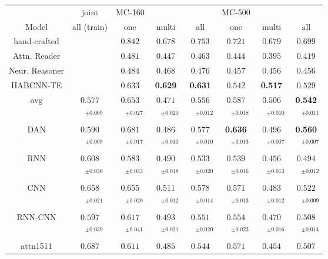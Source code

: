 \documentclass[11pt]{article}
\begin{document}
\begin{figure*}[t]
\centering
\setlength{\tabcolsep}{3pt}
\begin{tabular}{|c|c|ccc|ccc|}
\hline
& joint & MC-160     &             &            & MC-500     &      & \\
Model       & all (train)        & one & multi & all & one & multi & all \\
\hline
\hline
hand-crafted &  & $0.842$ & $0.678$ & $0.753$ & $0.721$ & $0.679$ & $0.699$\\
\hline
\hline
Attn. Reader & & $0.481$ & $0.447$ & $0.463$ & $0.444$ & $0.395$ & $0.419$ \\
Neur. Reasoner & & $0.484$ & $0.468$ & $0.476$ & $0.457$ & $0.456$ & $0.456$ \\
HABCNN-TE & & $0.633$ & \textbf{0.629} & \textbf{0.631} & $0.542$ & \textbf{0.517} & $0.529$ \\
\hline
avg & $0.577$ & $0.653$ & $0.471$ & $0.556$ & $0.587$ & $0.506$ & \textbf{0.542}\\
 & $\quad^{\pm0.009}$ & $\quad^{\pm0.027}$ & $\quad^{\pm0.020}$ & $\quad^{\pm0.012}$ & $\quad^{\pm0.018}$ & $\quad^{\pm0.010}$ & $\quad^{\pm0.011}$\\
DAN & $0.590$ & $0.681$ & $0.486$ & $0.577$ & \textbf{0.636} & $0.496$ & \textbf{0.560}\\
 & $\quad^{\pm0.009}$ & $\quad^{\pm0.017}$ & $\quad^{\pm0.010}$ & $\quad^{\pm0.010}$ & $\quad^{\pm0.013}$ & $\quad^{\pm0.007}$ & $\quad^{\pm0.007}$\\
\hline
RNN & $0.608$ & $0.583$ & $0.490$ & $0.533$ & $0.539$ & $0.456$ & $0.494$\\
 & $\quad^{\pm0.030}$ & $\quad^{\pm0.033}$ & $\quad^{\pm0.018}$ & $\quad^{\pm0.020}$ & $\quad^{\pm0.016}$ & $\quad^{\pm0.013}$ & $\quad^{\pm0.012}$\\
CNN & $0.658$ & $0.655$ & $0.511$ & $0.578$ & $0.571$ & $0.483$ & $0.522$\\
 & $\quad^{\pm0.021}$ & $\quad^{\pm0.020}$ & $\quad^{\pm0.012}$ & $\quad^{\pm0.014}$ & $\quad^{\pm0.013}$ & $\quad^{\pm0.012}$ & $\quad^{\pm0.009}$\\
RNN-CNN & $0.597$ & $0.617$ & $0.493$ & $0.551$ & $0.554$ & $0.470$ & $0.508$\\
 & $\quad^{\pm0.039}$ & $\quad^{\pm0.041}$ & $\quad^{\pm0.021}$ & $\quad^{\pm0.020}$ & $\quad^{\pm0.023}$ & $\quad^{\pm0.016}$ & $\quad^{\pm0.014}$\\
attn1511 & $0.687$ & $0.611$ & $0.485$ & $0.544$ & $0.571$ & $0.454$ & $0.507$\\

\end{tabular}
\end{figure*}
\end{document}

